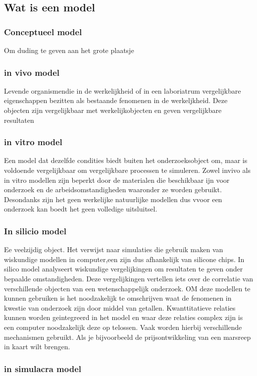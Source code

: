 \subsection{Wat is een model}
\subsubsection{Conceptueel model}
Om duding te geven aan het grote plaatsje
\subsubsection{in vivo model}
Levende organismendie in de werkelijkheid of in een laboriatrum vergelijkbare eigenschappen bezitten als bestaande fenomenen in de werkeljkheid. Deze objecten zijn vergelijkbaar met werkelijkobjecten en geven vergelijkbare resultaten
\subsubsection{in vitro model}
Een model dat dezelfde condities biedt  buiten het onderzoeksobject om, maar is voldoende vergelijkbaar om vergelijkbare processen te simuleren.
Zowel invivo als in vitro modellen zijn beperkt door de materialen die beschikbaar ijn voor onderzoek en de arbeidsomstandigheden waaronder ze worden gebruikt. Desondanks zijn het geen werkelijke natuurlijke modellen dus vvoor een onderzoek kan boedt het geen volledige uitsluitsel.
\subsubsection{In silicio model}
Ee veelzijdig object. Het verwijst naar simulaties die gebruik maken van wiskundige modellen in computer,een zijn dus afhankelijk van silicone chips. In silico model analyseert  wiskundige vergelijkingen om resultaten te geven onder bepaalde omstandigheden. Deze vergelijkingen vertellen iets over de correlatie van verschillende objecten van een wetenschappelijk onderzoek. OM deze modellen te kunnen gebruiken is het noodzakelijk te omschrijven waat de fenomenen in kwestie van onderzoek zijn door middel van getallen. Kwanttitatieve relaties kunnen worden geintegreerd in het model en waar deze relaties complex zijn is een computer noodzakelijk deze op telossen. Vaak worden hierbij verschillende mechanismen gebruikt. Als je bijvoorbeeld de prijsontwikkeling van een marsreep in kaart wilt brengen.
\subsubsection{in simulacra model}

